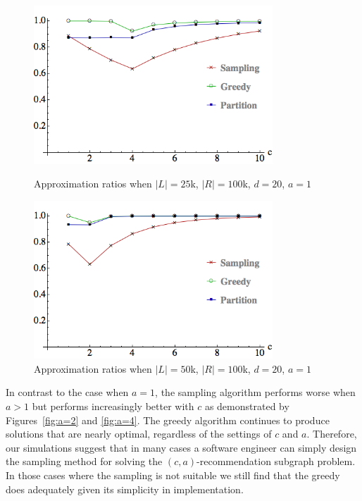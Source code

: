 \begin{figure}[t]
\centering
\begin{minipage}[h]{0.45\textwidth}
\centering
\includegraphics[width=0.8\textwidth]{images/l=25000,r=100000_Greedy_vs_Naive.png}
\caption{Approximation ratios when $|L|=25$k, $|R|=100$k, $d=20$, $a=1$}\label{fig:a=1:1}
\end{minipage}
\hspace{0.2cm}
\begin{minipage}[h]{0.45\textwidth}
\centering
\includegraphics[width=0.8\textwidth]{images/l=50000,r=100000_Greedy_vs_Naive.png}
\caption{Approximation ratios when $|L|=50$k, $|R|=100$k, $d=20$, $a=1$}\label{fig:a=1:2}
\end{minipage}
\end{figure}



In contrast to the case when $a=1$, the sampling algorithm performs
worse when $a>1$ but performs increasingly better with $c$ as
demonstrated by Figures~\ref{fig:a=2} and \ref{fig:a=4}. The greedy
algorithm continues to produce solutions that are nearly optimal,
regardless of the settings of $c$ and $a$. Therefore, our simulations
suggest that in many cases a software engineer can simply design the
sampling method for solving the $(c, a)$-recommendation subgraph
problem. In those cases where the sampling is not suitable we still
find that the greedy does adequately given its simplicity in
implementation.

